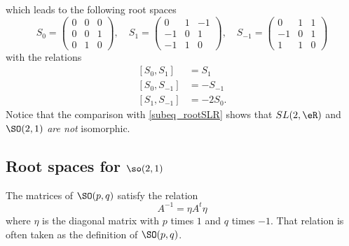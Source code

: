 which leads to the following root spaces
\begin{equation}
	S_{0}=
	\begin{pmatrix}
		0 & 0 & 0 \\
		0 & 0 & 1 \\
		0 & 1 & 0
	\end{pmatrix},\quad
	S_{1}=
	\begin{pmatrix}
		0  & 1 & -1 \\
		-1 & 0 & 1  \\
		-1 & 1 & 0
	\end{pmatrix},\quad
	S_{-1}=
	\begin{pmatrix}
		0  & 1 & 1 \\
		-1 & 0 & 1 \\
		1  & 1 & 0
	\end{pmatrix}
\end{equation}
with the relations
\begin{subequations}
	\begin{align}
		[S_{0},S_{1}]  & =S_{1}    \\
		[S_{0},S_{-1}] & =-S_{-1}  \\
		[S_{1},S_{-1}] & =-2S_{0}.
	\end{align}
\end{subequations}
Notice that the comparison with \eqref{subeq_rootSLR} shows that $SL(2,\eR)$ and $\SO(2,1)$ \emph{are not} isomorphic.

\subsection{Root spaces for \texorpdfstring{$\so(2,1)$}{so21}}

\begin{proposition}
	The matrices of $\SO(p,q)$ satisfy the relation
	\[
		A^{-1}=\eta A^t\eta
	\]
	where $\eta$ is the diagonal matrix with $p$ times $1$ and $q$ times $-1$. That relation is often taken as the definition of $\SO(p,q)$.
\end{proposition}


